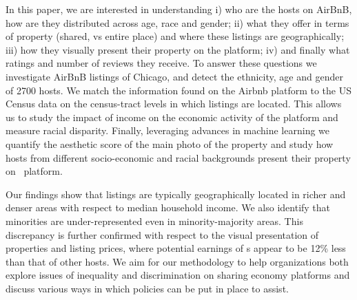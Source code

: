 In this paper, we are interested in understanding i) who are the hosts on AirBnB, how are they distributed across age, race and gender; ii) what they offer in terms of property (shared, vs entire place) and where these listings are geographically; iii) how they visually present  their property on the platform; iv) and finally what ratings and number of reviews they receive.  To answer these questions we investigate AirBnB listings of Chicago, and detect the ethnicity, age and gender of  2700  hosts. We match  the information found on the Airbnb platform to the US Census data on the census-tract levels in which listings are located. This allows us to study the impact of income on the economic activity of the platform and measure racial disparity. Finally, leveraging advances in machine learning we quantify the aesthetic score of the main photo of the property and study how  hosts from different socio-economic and racial backgrounds present their property on \ab \ platform. 


Our findings show that listings are typically geographically located in richer and denser areas with respect to median household income. We also identify that minorities are under-represented even in minority-majority areas. This discrepancy is further confirmed with respect to the visual presentation of properties and listing prices, where potential earnings of \aam s appear to be 12\% less than that of other hosts.  We aim for our methodology to help organizations both explore issues of inequality and discrimination on sharing economy platforms and discuss various ways in which policies can be put in place to assist.



